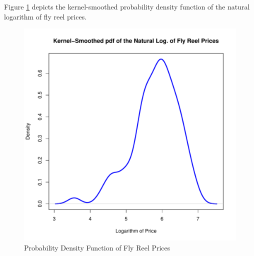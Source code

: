\documentclass[11pt]{book}
\begin{document}
Figure \ref{fig:density_log_prices} depicts
the kernel-smoothed probability density function of the natural logarithm of fly reel
prices.

\begin{figure}[h!]
  \centering
  \includegraphics[scale = 0.5, keepaspectratio=true]{../Figures/density_log_prices}
  \caption{Probability Density Function of Fly Reel Prices} \label{fig:density_log_prices}
\end{figure}







\end{document}
